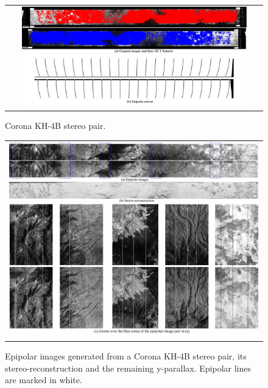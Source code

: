 \documentclass{ipol}
\begin{document}
\begin{figure}%
\centering
\begin{tabular}{c}
\includegraphics[width=0.9\textwidth]{FIGS/corona__sift_curves.jpg}
\end{tabular}
\caption{Corona KH-4B stereo pair.}
\label{ExpCoronaSIFT}
\end{figure}
%
\begin{figure}%
\centering
\begin{tabular}{c}
\includegraphics[width=\textwidth]{FIGS/Corona_epi_all.jpg}
\end{tabular}
\caption{Epipolar images generated from a Corona KH-4B stereo pair, its stereo-reconstruction and the remaining y-parallax. Epipolar lines are marked in white.}
 
\label{ExpCoronaEpi}
\end{figure}
\end{document}

